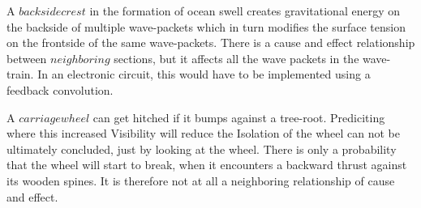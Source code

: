 \documentclass{report}
\begin{document}
A $backside crest$ in the formation of ocean swell creates gravitational energy on the backside of multiple wave-packets which in turn modifies the surface tension on the frontside of the same wave-packets. There is a cause and effect relationship between $neighboring$ sections, but it affects all the wave packets in the wave-train. In an electronic circuit, this would have to be implemented using a feedback convolution.

A $carriage wheel$ can get hitched if it bumps against a tree-root. Prediciting where this increased Visibility will reduce the Isolation of the wheel can not be ultimately concluded, just by looking at the wheel. There is only a probability that the wheel will start to break, when it encounters a backward thrust against its wooden spines. It is therefore not at all a neighboring relationship of cause and effect.
\end{document}
